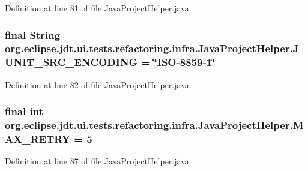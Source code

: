 Definition at line 81 of file JavaProjectHelper.java.

\hypertarget{classorg_1_1eclipse_1_1jdt_1_1ui_1_1tests_1_1refactoring_1_1infra_1_1JavaProjectHelper_a4800d44dacf636af372611d1ffb6d8a1}{
\subsubsection[{JUNIT\_\-SRC\_\-ENCODING}]{\setlength{\rightskip}{0pt plus 5cm}final String {\bf org.eclipse.jdt.ui.tests.refactoring.infra.JavaProjectHelper.JUNIT\_\-SRC\_\-ENCODING} = \char`\"{}ISO-\/8859-\/1\char`\"{}}}
\label{classorg_1_1eclipse_1_1jdt_1_1ui_1_1tests_1_1refactoring_1_1infra_1_1JavaProjectHelper_a4800d44dacf636af372611d1ffb6d8a1}


Definition at line 82 of file JavaProjectHelper.java.

\hypertarget{classorg_1_1eclipse_1_1jdt_1_1ui_1_1tests_1_1refactoring_1_1infra_1_1JavaProjectHelper_a8b45a289f9403a104b4262a119f82351}{
\subsubsection[{MAX\_\-RETRY}]{\setlength{\rightskip}{0pt plus 5cm}final int {\bf org.eclipse.jdt.ui.tests.refactoring.infra.JavaProjectHelper.MAX\_\-RETRY} = 5}}
\label{classorg_1_1eclipse_1_1jdt_1_1ui_1_1tests_1_1refactoring_1_1infra_1_1JavaProjectHelper_a8b45a289f9403a104b4262a119f82351}


Definition at line 87 of file JavaProjectHelper.java.

